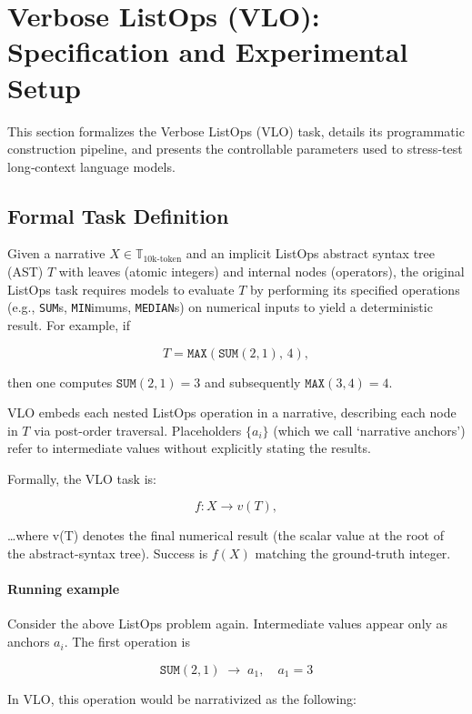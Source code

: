 \documentclass{article}
\begin{document}
\section{Verbose ListOps (VLO): Specification and Experimental Setup}
\label{sec:VLO-spec}

This section formalizes the Verbose ListOps (VLO) task, details its programmatic construction pipeline, and presents the controllable parameters used to stress‑test long‑context language models.

\subsection{Formal Task Definition}
\label{subsec:task-def}

Given a narrative $X \in \mathbb{T}_{10\mathrm{k}\text{-token}}$ and an implicit ListOps abstract syntax tree (AST) $T$ with leaves (atomic integers) and internal nodes (operators), the original ListOps task \citep{listops} requires models to evaluate $T$ by performing its specified operations (e.g., \texttt{SUM}s, \texttt{MIN}imums, \texttt{MEDIAN}s) on numerical inputs to yield a deterministic result. For example, if

\[
  T = \texttt{MAX}(\texttt{SUM}(2,1),\,4),
\]

then one computes $\texttt{SUM}(2,1)=3$ and subsequently $\texttt{MAX}(3,4)=4$.

VLO embeds each nested ListOps operation in a narrative, describing each node in $T$ via post-order traversal. Placeholders $\{a_i\}$ (which we call `narrative anchors') refer to intermediate values without explicitly stating the results.

Formally, the VLO task is:

\[
  f\colon X \longrightarrow v(T),
\]

…where v(T) denotes the final numerical result (the scalar value at the root of the abstract-syntax tree). Success is $f(X)$ matching the ground-truth integer.

\paragraph{Running example}
Consider the above ListOps problem again. Intermediate values appear only as anchors ${a_i}$. The first operation is

\[
  \texttt{SUM}(2,1) \;\to\; a_1,\quad a_1 = 3
\]

In VLO, this operation would be narrativized as the following:
\end{document}
